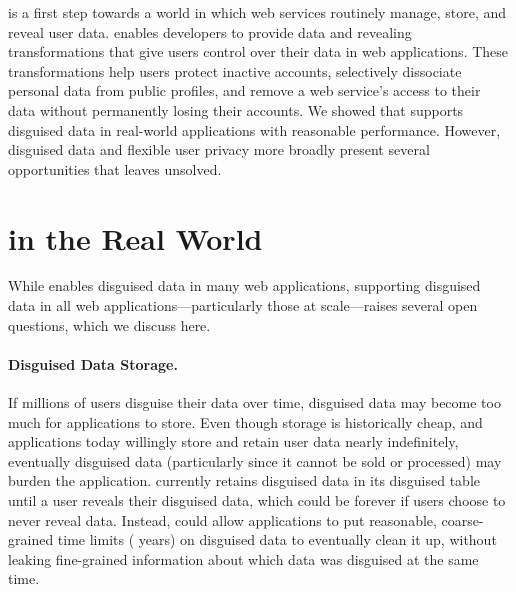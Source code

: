 %
\sys is a first step towards a world in which web services routinely manage,
store, and reveal \xxed user data.
%
\sys enables developers to provide data \xxing and revealing transformations
that give users control over their data in web applications.
%
These transformations help users protect inactive accounts, selectively
dissociate personal data from public profiles, and remove a web service's access
to their data without permanently losing their accounts.
%
We showed that \sys supports disguised data in real-world applications with
reasonable performance. However, disguised data and flexible user privacy more
broadly present several opportunities that \sys leaves unsolved.
%

\section{\sys in the Real World}

While \sys enables disguised data in many web applications, supporting disguised
data in all web applications---particularly those at scale---raises several
open questions, which we discuss here. 

%
\paragraph{Disguised Data Storage.}
If \eg millions of users disguise their data over time, disguised data may
become too much for applications to store.
%
Even though storage is historically cheap, and applications today willingly
store and retain user data nearly indefinitely, eventually disguised data
(particularly since it cannot be sold or processed) may burden the application.
%
\sys currently retains disguised data in its disguised table until a user reveals
their disguised data, which could be forever if users choose to never reveal
data.
%
Instead, \sys could allow applications to put reasonable, coarse-grained time
limits ( years) on disguised data to eventually clean it up, without
leaking fine-grained information about which data was disguised at the same
time.
%

%
